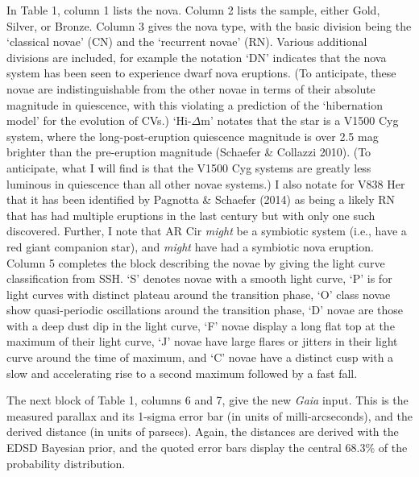 \documentclass[a4paper,fleqn,usenatbib]{mnras}
\begin{document}
In Table 1, column 1 lists the nova.  Column 2 lists the sample, either Gold, Silver, or Bronze.  Column 3 gives the nova type, with the basic division being the `classical novae' (CN) and the `recurrent novae' (RN).  Various additional divisions are included, for example the notation `DN' indicates that the nova system has been seen to experience dwarf nova eruptions.  (To anticipate, these novae are indistinguishable from the other novae in terms of their absolute magnitude in quiescence, with this violating a prediction of the `hibernation model' for the evolution of CVs.)  `Hi-$\Delta$m' notates that the star is a V1500 Cyg system, where the long-post-eruption quiescence magnitude is over 2.5 mag brighter than the pre-eruption magnitude (Schaefer \& Collazzi 2010).  (To anticipate, what I will find is that the V1500 Cyg systems are greatly less luminous in quiescence than all other novae systems.)  I also notate for V838 Her that it has been identified by Pagnotta \& Schaefer (2014) as being a likely RN that has had multiple eruptions in the last century but with only one such discovered.  Further, I note that AR Cir {\it might} be a symbiotic system (i.e., have a red giant companion star), and {\it might} have had a symbiotic nova eruption.  Column 5 completes the block describing the novae by giving the light curve classification from SSH.  `S' denotes novae with a smooth light curve, `P' is for light curves with distinct plateau around the transition phase, `O' class novae show quasi-periodic oscillations around the transition phase, `D' novae are those with a deep dust dip in the light curve, `F' novae display a long flat top at the maximum of their light curve, `J' novae have large flares or jitters in their light curve around the time of maximum, and `C' novae have a distinct cusp with a slow and accelerating rise to a second maximum followed by a fast fall.

The next block of Table 1, columns 6 and 7, give the new {\it Gaia} input.  This is the measured parallax and its 1-sigma error bar (in  units of milli-arcseconds), and the derived distance (in units of parsecs).  Again, the distances are derived with the EDSD Bayesian prior, and the quoted error bars display the central 68.3\% of the probability distribution.
\end{document}
